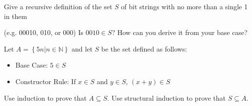 \documentclass[solution, letterpaper]{cs20}
\begin{document}
\subproblem Give a recursive definition of the set $S$ of bit strings with no more than a single 1 in them 

(e.g. 00010, 010, or 000)
\subproblem Is $0010\in S$? How can you derive it from your base case?

Let $A = \left\{ {5n|n\in\mathbb{N}}\right\}$ and let $S$ be the set defined as follows:
\begin{itemize}
\item Base Case: $5 \in S$
\item Constructor Rule: If $x\in S$ and $y\in S$, $(x+y) \in S$ 
\end{itemize}
\subproblem Use induction to prove that $A\subseteq S $.
\subproblem Use structural induction to prove that $S\subseteq A$.
\end{document}
